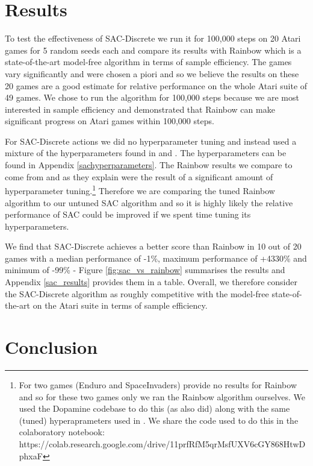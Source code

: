\documentclass{article}
\begin{document}
\section{Results}

To test the effectiveness of SAC-Discrete we run it for 100,000 steps on 20 Atari games for 5 random seeds each and compare its results with Rainbow which is a state-of-the-art model-free algorithm in terms of sample efficiency.  The games vary significantly and were chosen a piori and so we believe the results on these 20 games are a good estimate for relative performance on the whole Atari suite of 49 games.  We chose to run the algorithm for 100,000 steps because we are most interested in sample efficiency and \citet{model-Atari} demonstrated that Rainbow can make significant progress on Atari games within 100,000 steps.

For SAC-Discrete actions we did no hyperparameter tuning and instead used a mixture of the hyperparameters found in \citet{SACapplications} and \citet{model-Atari}. The hyperparameters can be found in Appendix \ref{sachyperparameters}. The Rainbow results we compare to come from \citet{model-Atari} and as they explain were the result of a significant amount of hyperparameter tuning.\footnote{For two games (Enduro and SpaceInvaders) \citet{model-Atari} provide no results for Rainbow and so for these two games only we ran the Rainbow algorithm ourselves. We used the Dopamine \parencite{dopamine} codebase to do this (as \citet{model-Atari} also did) along with the same (tuned) hyperaprameters used in \citet{model-Atari}. We share the code used to do this in the colaboratory notebook: https://colab.research.google.com/drive/11prfRfM5qrMsfUXV6cGY868HtwDphxaF} Therefore we are comparing the tuned Rainbow algorithm to our untuned SAC algorithm and so it is highly likely the relative performance of SAC could be improved if we spent time tuning its hyperparameters. 

We find that SAC-Discrete achieves a better score than Rainbow in 10 out of 20 games with a median performance of -1\%, maximum performance of +4330\% and minimum of -99\% - Figure \ref{fig:sac_vs_rainbow} summarises the results and Appendix \ref{sac_results} provides them in a table. Overall, we therefore consider the SAC-Discrete algorithm as roughly competitive with the model-free state-of-the-art on the Atari suite in terms of sample efficiency. 

\section{Conclusion}
\end{document}
